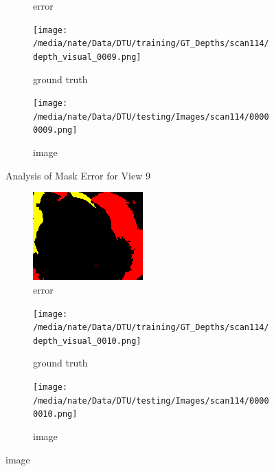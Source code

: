 \documentclass{article}
\begin{document}
\begin{figure}
\begin{subfigure}{0.3\textwidth}
		\caption{error}
		\label{fig:error9}
	\end{subfigure}
	\hfill
	\centering
	\begin{subfigure}{0.3\textwidth}
		\centering
		\texttt{[image: /media/nate/Data/DTU/training/GT\_Depths/scan114/depth\_visual\_0009.png]}
		\caption{ground truth}
		\label{fig:gt9}
	\end{subfigure}
	\hfill
	\centering
	\begin{subfigure}{0.3\textwidth}
		\centering
		\texttt{[image: /media/nate/Data/DTU/testing/Images/scan114/00000009.png]}
		\caption{image}
		\label{fig:img9}
	\end{subfigure}
	\hfill
	\caption{Analysis of Mask Error for View 9}
	\label{fig:error_analys9}
\end{figure}\begin{figure}
	\centering
	\begin{subfigure}{0.3\textwidth}
		\centering
		\includegraphics[width=\textwidth]{./output/010_error.png}
		\caption{error}
		\label{fig:error10}
	\end{subfigure}
	\hfill
	\centering
	\begin{subfigure}{0.3\textwidth}
		\centering
		\texttt{[image: /media/nate/Data/DTU/training/GT\_Depths/scan114/depth\_visual\_0010.png]}
		\caption{ground truth}
		\label{fig:gt10}
	\end{subfigure}
	\hfill
	\centering
	\begin{subfigure}{0.3\textwidth}
		\centering
		\texttt{[image: /media/nate/Data/DTU/testing/Images/scan114/00000010.png]}
		\caption{image}

\end{subfigure}
\end{figure}
\end{document}
